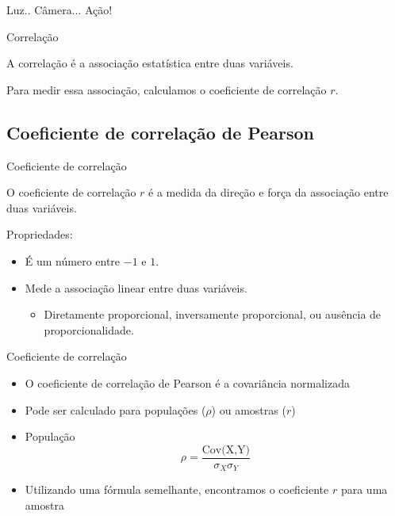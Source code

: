 \documentclass{beamer}
\begin{document}
\begin{frame}{Luz.. Câmera... Ação!}
  \begin{center}
  \end{center}
\end{frame}

\begin{frame}{Correlação}
  \begin{definition}
    A correlação é a associação estatística entre duas variáveis.
  \end{definition}
  
  Para medir essa associação, calculamos o \alert{coeficiente de
    correlação} $r$.
  
\end{frame}



\subsection[Pearson]{Coeficiente de correlação de Pearson}

\begin{frame}{Coeficiente de correlação}
  \begin{definition}
    O coeficiente de correlação $r$ é a medida da direção e força da
    associação entre duas variáveis.
  \end{definition}
  Propriedades:
  \begin{itemize}
  \item É um número entre $-1$ e $1$.
  \item Mede a associação \alert{linear} entre duas variáveis.
    \begin{itemize}
    \item Diretamente proporcional, inversamente proporcional, ou
      ausência de proporcionalidade.
    \end{itemize}
  \end{itemize}
\end{frame}

\begin{frame}{Coeficiente de correlação}
  \begin{itemize}
  \item O coeficiente de correlação de Pearson é a covariância
    normalizada
  \item Pode ser calculado para populações ($\rho$) ou amostras ($r$)
  \item População
    \begin{displaymath}
      \rho = \frac{\text{Cov(X,Y)}}{\sigma_X \sigma_Y}
    \end{displaymath}
  \item Utilizando uma fórmula semelhante, encontramos o coeficiente
    $r$ para uma amostra
  \end{itemize}
\end{frame}
\end{document}

